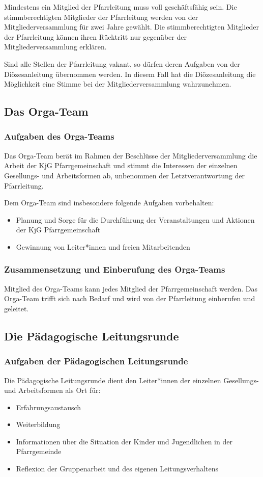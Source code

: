 \documentclass[12pt]{report}
\begin{document}
\begin{flushleft}
Mindestens ein Mitglied der Pfarrleitung muss voll geschäftsfähig sein.
Die stimmberechtigten Mitglieder der Pfarrleitung werden von der Mitgliederversammlung für
zwei Jahre gewählt. Die stimmberechtigten Mitglieder der Pfarrleitung können ihren Rücktritt nur
gegenüber der Mitgliederversammlung erklären.

Sind alle Stellen der Pfarrleitung vakant, so dürfen deren Aufgaben von der
Diözesanleitung übernommen werden. In diesem Fall hat die Diözesanleitung die Möglichkeit eine
Stimme bei der Mitgliederversammlung wahrzunehmen.

\subsection{Das Orga-Team}

\subsubsection{Aufgaben des Orga-Teams}

Das Orga-Team berät im Rahmen der Beschlüsse der Mitgliederversammlung die Arbeit der KjG
Pfarrgemeinschaft und stimmt die Interessen der einzelnen Gesellungs- und Arbeitsformen ab,
unbenommen der Letztverantwortung der Pfarrleitung.

Dem Orga-Team sind insbesondere folgende Aufgaben vorbehalten:
\begin{itemize}
  \item Planung und Sorge für die Durchführung der Veranstaltungen und Aktionen der KjG Pfarrgemeinschaft
  \item Gewinnung von Leiter*innen und freien Mitarbeitenden
\end{itemize}

\subsubsection{Zusammensetzung und Einberufung des Orga-Teams}
Mitglied des Orga-Teams kann jedes Mitglied der Pfarrgemeinschaft werden. Das Orga-Team
trifft sich nach Bedarf und wird von der Pfarrleitung einberufen und geleitet.

\subsection{Die Pädagogische Leitungsrunde}

\subsubsection{Aufgaben der Pädagogischen Leitungsrunde}
Die Pädagogische Leitungsrunde dient den Leiter*innen der einzelnen Gesellungs- und Arbeitsformen als Ort für:
\begin{itemize}
  \item Erfahrungsaustausch
  \item Weiterbildung
  \item Informationen über die Situation der Kinder und Jugendlichen in der Pfarrgemeinde
  \item Reflexion der Gruppenarbeit und des eigenen Leitungsverhaltens
\end{itemize}


\end{flushleft}
\end{document}
